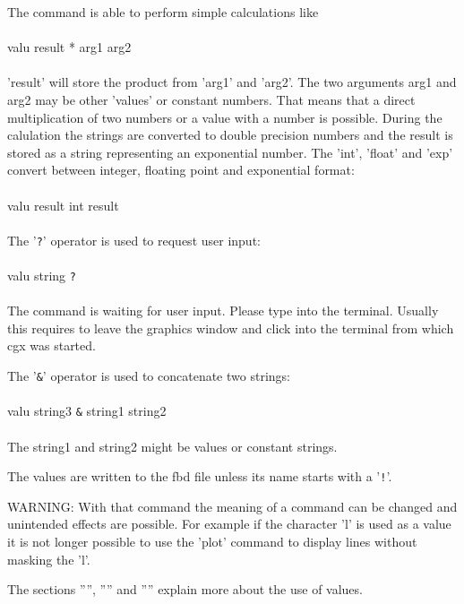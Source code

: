 \documentclass{article}
\begin{document}
The command is able to perform simple calculations like\\\\valu result * arg1 arg2\\\\'result' will store the product from 'arg1' and 'arg2'. The two arguments arg1 and arg2 may be other 'values' or constant numbers. That means that a direct multiplication of two numbers or a value with a number is possible. During the calulation the strings are converted to double precision numbers and the result is stored as a string representing an exponential number. The 'int', 'float' and 'exp' convert between integer, floating point and exponential format:\\\\valu result int result\\\\

The '\verb_?_' operator is used to request user input:\\\\valu string \verb_?_\\\\The command is waiting for user input. Please type into the terminal. Usually this requires to leave the graphics window and click into the terminal from which cgx was started.

The '\verb_&_' operator is used to concatenate two strings:\\\\valu string3 \verb_&_ string1 string2\\\\The string1 and string2 might be values or constant strings.

The values are written to the fbd file unless its name starts with a '\verb_!_'. 

WARNING: With that command the meaning of a command can be changed and unintended effects are possible. For example if the character 'l' is used as a value it is not longer possible to use the 'plot' command to display lines without masking the 'l'.

The sections '''', '''' and '''' explain more about the use of values.
\end{document}
